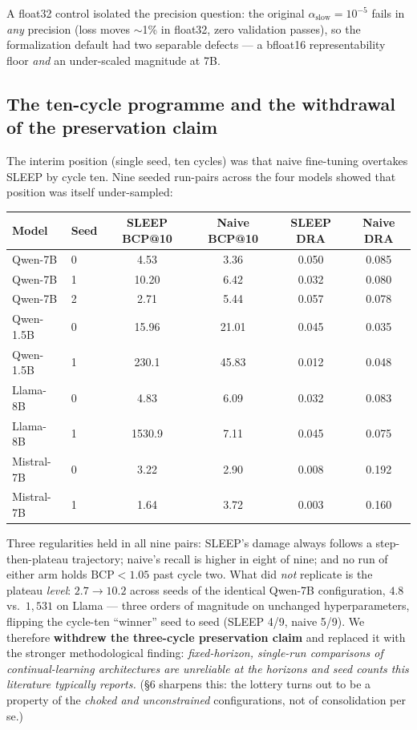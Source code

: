 \documentclass[11pt]{article}
\begin{document}
A float32 control isolated the precision question: the original
$\alpha_{\mathrm{slow}} = 10^{-5}$ fails in \emph{any} precision (loss moves $\sim$1\% in float32,
zero validation passes), so the formalization default had two separable defects --- a bfloat16
representability floor \emph{and} an under-scaled magnitude at 7B.

\subsection{The ten-cycle programme and the withdrawal of the preservation claim}

The interim position (single seed, ten cycles) was that naive fine-tuning overtakes SLEEP by cycle
ten. Nine seeded run-pairs across the four models showed that position was itself under-sampled:

\begin{center}
\small
\begin{tabular}{@{}l l c c c c@{}}
\toprule
Model & Seed & SLEEP BCP@10 & Naive BCP@10 & SLEEP DRA & Naive DRA \\
\midrule
Qwen-7B    & 0 & 4.53   & 3.36  & 0.050 & 0.085 \\
Qwen-7B    & 1 & 10.20  & 6.42  & 0.032 & 0.080 \\
Qwen-7B    & 2 & 2.71   & 5.44  & 0.057 & 0.078 \\
Qwen-1.5B  & 0 & 15.96  & 21.01 & 0.045 & 0.035 \\
Qwen-1.5B  & 1 & 230.1  & 45.83 & 0.012 & 0.048 \\
Llama-8B   & 0 & 4.83   & 6.09  & 0.032 & 0.083 \\
Llama-8B   & 1 & 1530.9 & 7.11  & 0.045 & 0.075 \\
Mistral-7B & 0 & 3.22   & 2.90  & 0.008 & 0.192 \\
Mistral-7B & 1 & 1.64   & 3.72  & 0.003 & 0.160 \\
\bottomrule
\end{tabular}
\end{center}

Three regularities held in all nine pairs: SLEEP's damage always follows a step-then-plateau
trajectory; naive's recall is higher in eight of nine; and no run of either arm holds
$\mathrm{BCP} < 1.05$ past cycle two. What did \emph{not} replicate is the plateau \emph{level}:
$2.7 \to 10.2$ across seeds of the identical Qwen-7B configuration, $4.8$ vs.\ $1{,}531$ on Llama
--- three orders of magnitude on unchanged hyperparameters, flipping the cycle-ten ``winner'' seed
to seed (SLEEP 4/9, naive 5/9). We therefore \textbf{withdrew the three-cycle preservation claim}
and replaced it with the stronger methodological finding: \emph{fixed-horizon, single-run
comparisons of continual-learning architectures are unreliable at the horizons and seed counts
this literature typically reports.} (\S6 sharpens this: the lottery turns out to be a property of
the \emph{choked and unconstrained} configurations, not of consolidation per se.)
\end{document}
